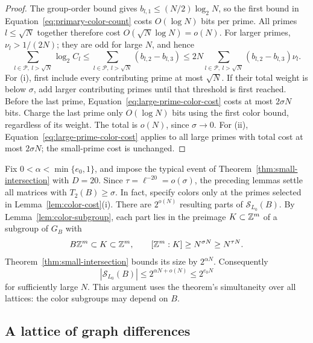 \begin{proof}
The group-order bound gives
\(b_{l,1}\le(N/2)\log_2N\), so the first bound in
Equation~\eqref{eq:primary-color-count} costs \(O(\log N)\) bits
per prime. All primes \(l\le\sqrt N\) together therefore cost
\(O(\sqrt N\log N)=o(N)\).
For larger primes, \(\nu_l>1/(2N)\); they are odd for large
\(N\), and hence
\begin{equation}\label{eq:large-prime-color-cost}
 \sum_{l\in\mathcal P,\ l>\sqrt N}\log_2 C_l
 \le\sum_{l\in\mathcal P,\ l>\sqrt N}(b_{l,2}-b_{l,3})
 \le2N\sum_{l\in\mathcal P,\ l>\sqrt N}
                 (b_{l,2}-b_{l,3})\nu_l.
\end{equation}
For \textup{(i)}, first include every contributing prime at most
\(\sqrt N\). If their total weight is below \(\sigma\), add
larger contributing primes until that threshold is first reached.
Before the last prime, Equation~\eqref{eq:large-prime-color-cost}
costs at most \(2\sigma N\) bits. Charge the last prime only
\(O(\log N)\) bits using the first color bound, regardless of
its weight. The total is \(o(N)\), since \(\sigma\to0\).
For \textup{(ii)}, Equation~\eqref{eq:large-prime-color-cost}
applies to all large primes with total cost at most
\(2\sigma N\); the small-prime cost is unchanged.
\end{proof}

Fix \(0<\alpha<\min\{e_0,1\}\), and impose the typical event of
Theorem~\ref{thm:small-intersection} with \(D=20\). Since
\(\tau=\ell^{-20}=o(\sigma)\), the preceding lemmas settle all
matrices with \(T_2(B)\ge\sigma\). In fact, specify colors only
at the primes selected in Lemma~\ref{lem:color-cost}\textup{(i)}.
There are \(2^{o(N)}\) resulting parts of
\(\mathcal S_{L_0}(B)\). By Lemma~\ref{lem:color-subgroup}, each
part lies in the preimage \(K\subset\mathbb Z^m\) of a subgroup of
\(G_B\) with
\[
 B\mathbb Z^m\subset K\subset\mathbb Z^m,
 \qquad [\mathbb Z^m:K]\ge N^{\sigma N}\ge N^{\tau N}.
\]
Theorem~\ref{thm:small-intersection} bounds its size by
\(2^{\alpha N}\). Consequently
\begin{equation}\label{eq:height-two-columns}
 |\mathcal S_{L_0}(B)|\le2^{\alpha N+o(N)}\le2^{e_0N}
\end{equation}
for sufficiently large \(N\). This argument uses the theorem's
simultaneity over all lattices: the color subgroups may depend on
\(B\).

\subsection{A lattice of graph differences}

